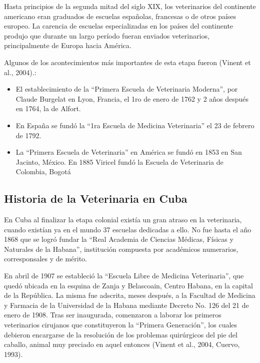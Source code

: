 Hasta principios de la segunda mitad del siglo XIX, los veterinarios del continente americano eran graduados de escuelas españolas, francesas o de otros países europeo. La carencia de escuelas especializadas en los países del continente produjo que durante un largo período fueran enviados veterinarios, principalmente de Europa hacia América.  

Algunos de los acontecimientos más importantes de esta etapa fueron (Vinent et al., 2004).: 
\begin{itemize}
 \item El establecimiento de la “Primera Escuela de Veterinaria Moderna”, por Claude Burgelat en Lyon, Francia, el 1ro de enero de 1762 y 2 años después en 1764, la de Alfort.  
 \item En España se fundó la “1ra Escuela de Medicina Veterinaria” el 23 de febrero de 1792.  
 \item  La “Primera Escuela de Veterinaria” en América se fundó en 1853 en San Jacinto, México. En 1885 Viricel fundó la Escuela de Veterinaria de Colombia, Bogotá  
\end{itemize}
\newpage


\subsection{Historia de la Veterinaria en Cuba }

En Cuba al finalizar la etapa colonial existía un gran atraso en la veterinaria, cuando existían ya en el mundo 37 escuelas dedicadas a ello. No fue hasta el año 1868 que se logró fundar la “Real Academia de Ciencias Médicas, Físicas y Naturales de la Habana”, institución compuesta por académicos numerarios, corresponsales y de mérito.  

En abril de 1907 se estableció la “Escuela Libre de Medicina Veterinaria”, que quedó ubicada en la esquina de Zanja y Belascoain, Centro Habana, en la capital de la República. La misma fue adscrita, meses después, a la Facultad de Medicina y Farmacia de la Universidad de la Habana mediante Decreto No. 126 del 21 de enero de 1908. Tras ser inaugurada, comenzaron a laborar los primeros veterinarios cirujanos que constituyeron la “Primera Generación”, los cuales debieron encargarse de la resolución de los problemas quirúrgicos del pie del caballo, animal muy preciado en aquel entonces (Vinent et al., 2004, Cuervo, 1993).  

